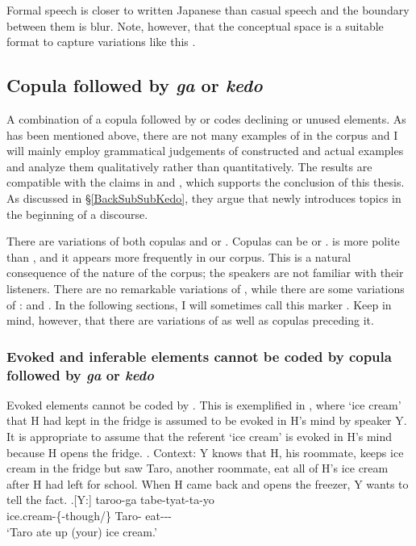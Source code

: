 Formal speech is closer to written Japanese than casual speech
and the boundary between them is blur.
Note, however, that
the conceptual space is a suitable format to capture variations like this \cite[see][]{croft10}.

\subsection{Copula followed by \textit{ga} or \textit{kedo}}\label{kedo}

A combination of a copula followed by  or 
codes declining or unused elements.
As has been mentioned above,
there are not many examples of  in the corpus
and I will mainly employ grammatical judgements of constructed and actual examples
and analyze them qualitatively rather than quantitatively.
The results are compatible with the claims in  and ,
which supports the conclusion of this thesis.
As discussed in \S \ref{BackSubSubKedo},
they argue that  newly introduces topics in the beginning of a discourse.

There are variations of both copulas and  or .
Copulas can be  or .
 is more polite than ,
and it appears more frequently in our corpus.
This is a natural consequence of the nature of the corpus;
the speakers are not familiar with their listeners.
There are no remarkable variations of ,
while there are some variations of :
 and .
In the following sections,
I will sometimes call this marker .
Keep in mind, however, that there are variations of  as well as copulas preceding it.

\subsubsection{Evoked and inferable elements cannot be coded by copula followed by \textit{ga} or \textit{kedo}}

Evoked elements cannot be coded by .
This is exemplified in \Next,
where `ice cream' that H had kept in the fridge is assumed to be evoked in H's mind by speaker Y.
It is appropriate to assume that the referent `ice cream' is evoked in H's mind
because H opens the fridge.
%
\ex. Context: Y knows that H, his roommate, keeps ice cream in the fridge
	but saw Taro, another roommate, eat all of H's ice cream after H had left for school.
	When H came back and opens the freezer,
	Y wants to tell the fact.
	\ag.[Y:]  taroo-ga tabe-tyat-ta-yo \\
		ice.cream-\{-though/\} Taro- eat--- \\
		`Taro ate up (your) ice cream.'


